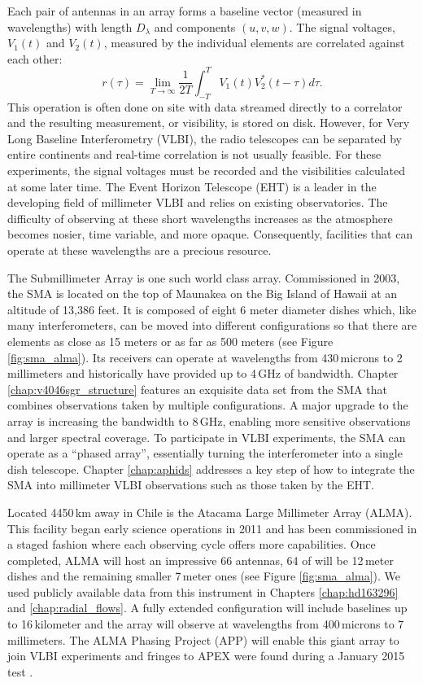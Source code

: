 Each pair of antennas in an array forms a baseline vector (measured in wavelengths) with length $D_\lambda$ and 
components $(u,v,w)$.  The signal voltages, $V_1(t)$ and $V_2(t)$, measured by the individual 
elements are correlated against each other:
\begin{equation}
r(\tau) = \lim_{T \to \infty} \frac{1}{2T} \int_{-T}^T V_1(t) V_2^\ast(t-\tau) d\tau.
\end{equation}
This operation is often done on site with data streamed directly to a correlator and the resulting 
measurement, or visibility, is stored on disk.  However, for Very Long Baseline Interferometry (VLBI), the 
radio telescopes can be separated by entire continents and real-time correlation is not usually feasible.  For 
these experiments, the signal voltages must be recorded and the visibilities calculated at some later time.  The 
Event Horizon Telescope (EHT) is a leader in the developing field of millimeter VLBI and relies on existing 
observatories.  The difficulty of observing at these short wavelengths increases as the atmosphere becomes 
nosier, time variable, and more opaque.  Consequently, facilities that can operate at these wavelengths are a 
precious resource.

The Submillimeter Array \citep[SMA;][]{ho04} is one such world class array.  Commissioned in 2003, the SMA is 
located on the top of Maunakea on the Big Island of Hawaii at an altitude of 13,386 feet.
It is composed of eight 6 meter diameter dishes which, like many interferometers, can be moved into different 
configurations so that there are elements as close as 15 meters or as far as 500 meters (see Figure 
\ref{fig:sma_alma}).  Its receivers can operate at wavelengths from 430\,microns to 2\,millimeters and 
historically have provided up to 4\,GHz of bandwidth.  Chapter \ref{chap:v4046sgr_structure} features an 
exquisite data set from the SMA that combines observations taken by multiple configurations.  A major upgrade to 
the array is increasing the bandwidth to 8\,GHz, enabling more sensitive observations and larger spectral 
coverage.  To participate in VLBI experiments, the SMA can operate as a ``phased array'', essentially turning 
the interferometer into a single dish telescope.  Chapter \ref{chap:aphids} addresses a key step of how to 
integrate the SMA into millimeter VLBI observations such as those taken by the EHT.

Located 4450\,km away in Chile is the Atacama Large Millimeter Array (ALMA).  This facility began early
science operations in 2011 and has been commissioned in a staged fashion where each observing cycle offers more 
capabilities.  Once completed, ALMA will host an impressive 66 antennas, 64 of will be 12\,meter dishes and
the remaining smaller 7\,meter ones (see Figure \ref{fig:sma_alma}).  We used publicly available data from 
this instrument in Chapters \ref{chap:hd163296} and \ref{chap:radial_flows}.  A fully extended configuration 
will include baselines up to 16\,kilometer and the array will observe at wavelengths from 400\,microns to 
7\,millimeters.  The ALMA Phasing Project (APP) will enable this giant array to join VLBI experiments and 
fringes to APEX were found during a January 2015 test \citep{matthews15}.

